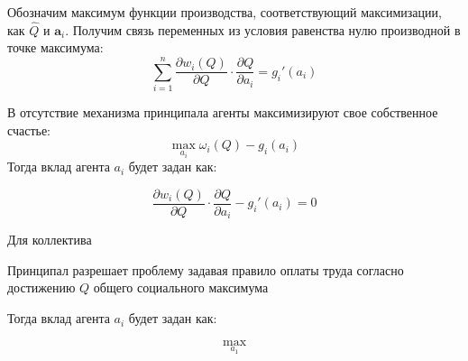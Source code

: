 Обозначим максимум функции производства, соответствующий максимизации, как $\hat{Q}$ и $\mathbf{a}_i$.
Получим связь переменных из условия равенства нулю производной в точке максимума: 
\begin{equation}
    \sum_{i=1}^n\frac{\partial w_i(Q)}{\partial Q } \cdot \frac{\partial Q}{\partial a_i} = g_i'(a_i) 
\end{equation}



В отсутствие механизма принципала агенты максимизируют свое собственное счастье:
\begin{equation}
    \max_{a_i} \omega_i(Q) - g_i(a_i)
\end{equation}
Тогда вклад агента $a_i$ будет задан как:

\begin{equation}
    \frac{\partial w_i(Q)}{\partial Q } \cdot \frac{\partial Q}{\partial a_i} - g_i'(a_i) =0 
\end{equation}


Для коллектива

Принципал разрешает проблему задавая правило оплаты труда согласно достижению $Q$ общего социального максимума  

Тогда вклад агента $a_i$ будет задан как:






$$
    \max_{a_1}
$$




